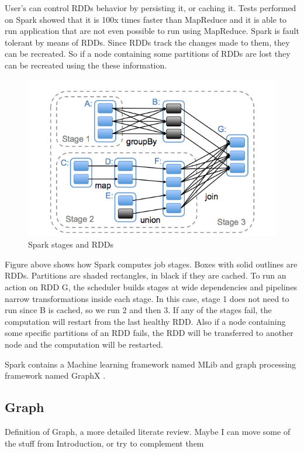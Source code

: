 \documentclass[english]{tktltiki}
\begin{document}
 User's can control RDDs behavior by persisting it, or caching it. Tests performed on Spark showed that it is 100x times faster than MapReduce and it is able to run application that are not even possible to run using MapReduce. Spark is fault tolerant by means of RDDs. Since RDDs track the changes made to them, they can be recreated. So if a node containing some partitions of RDDs are lost they can be recreated using the these information. 
 
\begin{figure}[ht!]
\centering
\includegraphics[width=130mm]{figures/rdd.png}
\caption{Spark stages and RDDs}
\end{figure}
Figure above shows how Spark computes job stages. Boxes with solid outlines are RDDs. Partitions are shaded rectangles, in black if they are cached. To run an action on RDD G, the scheduler builds stages at wide dependencies and pipelines narrow transformations inside each stage. In this case, stage 1 does not need to run since B is cached, so we run 2 and then 3. If any of the stages fail, the computation will restart from the last healthy RDD. Also if a node containing some specific partitions of an RDD fails, the RDD will be transferred to another node and the computation will be restarted. 

Spark contains a Machine learning framework named MLib and graph processing framework named GraphX . 

\subsection{Graph}
Definition of Graph, a more detailed literate review. Maybe I can move some of the stuff from Introduction, or try to complement them
\end{document}
